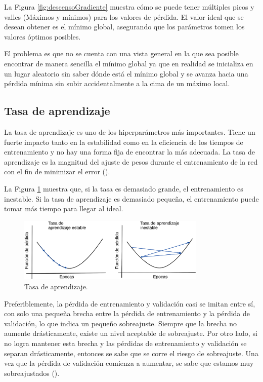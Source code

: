 La Figura \ref{fig:descensoGradiente} muestra cómo se puede tener múltiples picos y valles (Máximos y mínimos) para los valores de pérdida. El valor ideal que se desean obtener es el mínimo global, asegurando que los parámetros tomen los valores óptimos posibles.

El problema es que no se cuenta con una vista general en la que sea posible encontrar de manera sencilla el mínimo global ya que en realidad se inicializa en un lugar aleatorio sin saber dónde está el mínimo global y se avanza hacia una pérdida mínima sin subir accidentalmente a la cima de un máximo local.

\subsection{Tasa de aprendizaje}

La tasa de aprendizaje es uno de los hiperparámetros más importantes. Tiene un fuerte impacto tanto en la estabilidad como en la eficiencia de los tiempos de entrenamiento y no hay una forma fija de encontrar la más adecuada. La tasa de aprendizaje es la magnitud del ajuste de pesos durante el entrenamiento de la red con el fin de minimizar el error (\cite{valenzuela2020Sistema}).

La Figura \ref{fig:learningRate} muestra que, si la tasa es demasiado grande, el entrenamiento es inestable. Si la tasa de aprendizaje es demasiado pequeña, el entrenamiento puede tomar más tiempo para llegar al ideal.

\begin{figure}[H]
    \centering
    \includegraphics[width=0.8\textwidth]{MarcoTeorico/imgs/LearningRate.png}
    \caption{Tasa de aprendizaje.}
    \label{fig:learningRate}
\end{figure}

Preferiblemente, la pérdida de entrenamiento y validación casi se imitan entre sí, con solo una pequeña brecha entre la pérdida de entrenamiento y la pérdida de validación, lo que indica un pequeño sobreajuste. Siempre que la brecha no aumente drásticamente, existe un nivel aceptable de sobreajuste. Por otro lado, si no logra mantener esta brecha y las pérdidas de entrenamiento y validación se separan drásticamente, entonces se sabe que se corre el riesgo de sobreajuste. Una vez que la pérdida de validación comienza a aumentar, se sabe que estamos muy sobreajustados (\cite{rosebrock2017deep}).


